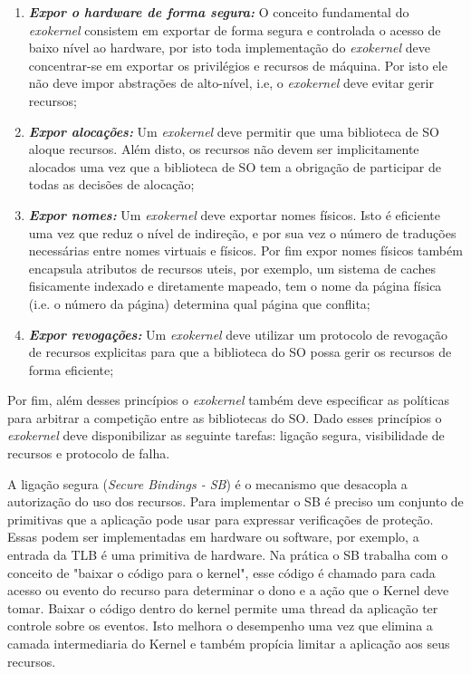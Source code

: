 \begin{enumerate}
  \item \textbf{\emph{Expor o hardware de forma segura:}} O conceito
        fundamental do \emph{exokernel} consistem em exportar de forma segura
        e controlada o acesso de baixo nível ao hardware, por isto toda
        implementação do \emph{exokernel} deve concentrar-se em exportar os
        privilégios e recursos de máquina. Por isto ele não deve impor
        abstrações de alto-nível, i.e, o \emph{exokernel} deve evitar gerir
        recursos;
  \item \textbf{\emph{Expor alocações:}} Um \emph{exokernel} deve permitir que
        uma biblioteca de SO aloque recursos. Além disto, os recursos não devem
        ser implicitamente alocados uma vez que a biblioteca de SO tem a
        obrigação de participar de todas as decisões de alocação;
  \item \textbf{\emph{Expor nomes:}} Um \emph{exokernel} deve exportar nomes
        físicos. Isto é eficiente uma vez que reduz o nível de indireção, e por
        sua vez o número de traduções necessárias entre nomes virtuais e
        físicos. Por fim expor nomes físicos também encapsula atributos de
        recursos uteis, por exemplo, um sistema de caches fisicamente indexado
        e diretamente mapeado, tem o nome da página física (i.e. o número da
        página) determina qual página que conflita;
  \item \textbf{\emph{Expor revogações:}} Um \emph{exokernel} deve utilizar um
        protocolo de revogação de recursos explicitas para que a biblioteca do
        SO possa gerir os recursos de forma eficiente;
\end{enumerate}

Por fim, além desses princípios o \emph{exokernel} também deve especificar as
políticas para arbitrar a competição entre as bibliotecas do SO. Dado esses
princípios o \emph{exokernel} deve disponibilizar as seguinte tarefas: ligação
segura, visibilidade de recursos e protocolo de falha.

A ligação segura (\emph{Secure Bindings - SB}) é o mecanismo que desacopla a
autorização do uso dos recursos. Para implementar o SB é preciso um conjunto de
primitivas que a aplicação pode usar para expressar verificações de proteção.
Essas podem ser implementadas em hardware ou software, por exemplo, a entrada
da TLB é uma primitiva de hardware. Na prática o SB trabalha com o conceito de
"baixar o código para o kernel", esse código é chamado para cada acesso ou
evento do recurso para determinar o dono e a ação que o Kernel deve tomar.
Baixar o código dentro do kernel permite uma thread da aplicação ter controle
sobre os eventos. Isto melhora o desempenho uma vez que elimina a camada
intermediaria do Kernel e também propícia limitar a aplicação aos seus
recursos.

